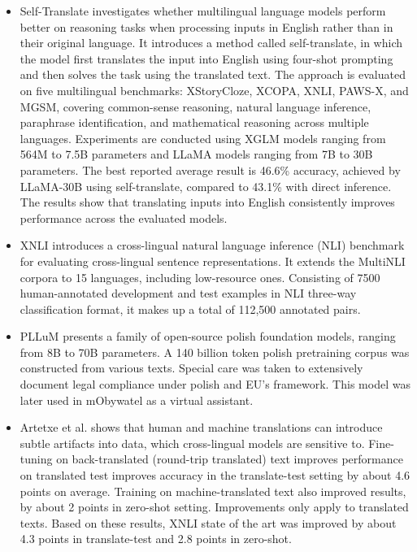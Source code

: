 \documentclass[11pt]{article}
\begin{document}
\begin{itemize}
\item Self-Translate \cite{etxaniz2023multilinguallanguagemodelsthink} investigates whether multilingual language models perform better on reasoning tasks when processing inputs in English rather than in their original language. It introduces a method called self-translate, in which the model first translates the input into English using four-shot prompting and then solves the task using the translated text. The approach is evaluated on five multilingual benchmarks: XStoryCloze, XCOPA, XNLI, PAWS-X, and MGSM, covering common-sense reasoning, natural language inference, paraphrase identification, and mathematical reasoning across multiple languages. Experiments are conducted using XGLM models ranging from 564M to 7.5B parameters and LLaMA models ranging from 7B to 30B parameters. The best reported average result is 46.6\% accuracy, achieved by LLaMA-30B using self-translate, compared to 43.1\% with direct inference. The results show that translating inputs into English consistently improves performance across the evaluated models.

\item XNLI \cite{DBLP:journals/corr/abs-1809-05053} introduces a cross-lingual natural language inference (NLI) benchmark for evaluating cross-lingual sentence representations. It extends the MultiNLI corpora to 15 languages, including low-resource ones. Consisting of 7500 human-annotated development and test examples in NLI three-way classification format, it makes up a total of 112,500 annotated pairs.

\item PLLuM \cite{kocon2025pllum} presents a family of open-source polish foundation models, ranging from 8B to 70B parameters. A 140 billion token polish pretraining corpus was constructed from various texts. Special care was taken to extensively document legal compliance under polish and EU's framework. This model was later used in mObywatel as a virtual assistant.

\item Artetxe et al. \cite{DBLP:journals/corr/abs-2004-04721} shows that human and machine translations can introduce subtle artifacts into data, which cross-lingual models are sensitive to. Fine-tuning on back-translated (round-trip translated) text improves performance on translated test improves accuracy in the translate-test setting by about 4.6 points on average. Training on machine-translated text also improved results, by about 2 points in zero-shot setting. Improvements only apply to translated texts. Based on these results, XNLI state of the art was improved by about 4.3 points in translate-test and 2.8 points in zero-shot.


\end{itemize}
\end{document}
